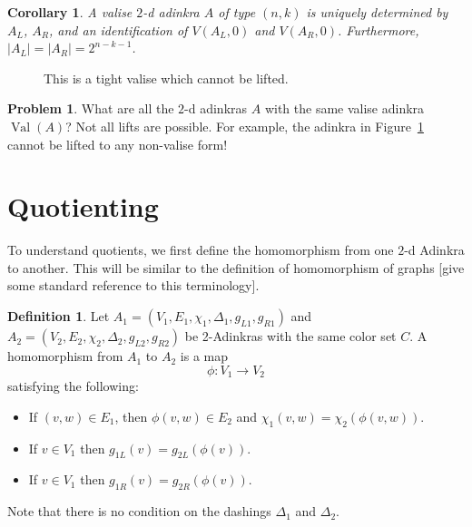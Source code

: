 \documentclass[12pt,twoside,singlespace]{article}
\numberwithin{equation}{section}
\newtheorem{cor}[equation]{Corollary}
\theoremstyle{definition}
\newtheorem{definition}[equation]{Definition}
\newtheorem{prob}{Problem}
\newcommand{\on}{\operatorname}
\newcommand{\val}{\on{Val}}
\begin{document}
\begin{cor}
\label{cor:valise factorization}
A valise $2$-d adinkra $A$ of type $(n,k)$ is uniquely determined by $A_L$, $A_R$, and an identification of $V(A_L, 0)$ and $V(A_R, 0)$. Furthermore, $|A_L| = |A_R| = 2^{n-k-1}$.
\end{cor}



\begin{figure}[htb]
\begin{center}

\caption{This is a tight valise which cannot be lifted.\label{fig:tight valise}}
\end{center}
\end{figure}

\begin{prob}
What are all the $2$-d adinkras $A$ with the same valise adinkra $\val(A)$? Not all lifts are possible. For example, the adinkra in Figure~\ref{fig:tight valise} cannot be lifted to any non-valise form!
\end{prob}

\section{Quotienting}
To understand quotients, we first define the homomorphism from one $2$-d Adinkra to another.  This will be similar to the definition of homomorphism of graphs [give some standard reference to this terminology].

\begin{definition}
Let 
$A_1=(V_1,E_1,\chi_1,\Delta_1,g_{L1},g_{R1})$
and
$A_2=(V_2,E_2,\chi_2,\Delta_2,g_{L2},g_{R2})$
be 2-Adinkras with the same color set $C$.  A homomorphism from $A_1$ to $A_2$ is a map
\[\phi:V_1\to V_2\]
satisfying the following:
\begin{itemize}
\item If $(v,w)\in E_1$, then $\phi(v,w)\in E_2$ and $\chi_1(v,w)=\chi_2(\phi(v,w))$.
\item If $v\in V_1$ then $g_{1L}(v)=g_{2L}(\phi(v))$.
\item If $v\in V_1$ then $g_{1R}(v)=g_{2R}(\phi(v))$.
\end{itemize}
Note that there is no condition on the dashings $\Delta_1$ and $\Delta_2$.
\end{definition}
\end{document}
